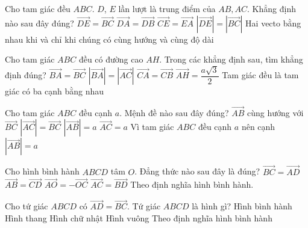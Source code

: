 \begin{ex}%
	Cho tam giác đều $ABC$. $D$, $E$ lần lượt là trung điểm của $AB,AC$. Khẳng định nào sau đây đúng?
	\choice
	{$\overrightarrow{DE}=\overrightarrow{BC}$}
	{$\overrightarrow{DA}=\overrightarrow{DB}$}
	{\True$\overrightarrow{CE}=\overrightarrow{EA}$}
	{ $|\overrightarrow{DE}|=|\overrightarrow{BC}|$}
	\loigiai
	{Hai vecto bằng nhau khi và chỉ khi chúng có cùng hướng và cùng độ dài }
\end{ex}

\begin{ex}%
	Cho tam giác $ABC $ đều có đường cao $AH$. Trong các khẳng định sau, tìm khẳng định đúng?
	\choice
	{$\overrightarrow{BA}=\overrightarrow{BC}$}
	{\True $|\overrightarrow{BA}|=|\overrightarrow{AC}|$}
	{$\overrightarrow{CA}=\overrightarrow{CB}$}
	{$\overrightarrow{AH}=\dfrac{a\sqrt{3}}{2}$}
	\loigiai
	{Tam giác đều là tam giác có ba cạnh bằng nhau}
\end{ex}

\begin{ex}%
	Cho tam giác $ABC$ đều cạnh $a$. Mệnh đề nào sau đây đúng?
	\choice
	{$\overrightarrow{AB}$ cùng hướng với $\overrightarrow{BC}$}
	{$|\overrightarrow{AC}|=\overrightarrow{BC}$}
	{\True $|\overrightarrow{AB}|=a$}
	{$\overrightarrow{AC}=a$}
	\loigiai
	{Vì tam giác $ABC$ đều cạnh $a$ nên cạnh $|\overrightarrow{AB}|=a$ }
\end{ex}


\begin{ex}%
	Cho hình bình hành $ABCD$ tâm $O$. Đẳng thức nào sau đây là đúng?
	\choice
	{\True $\overrightarrow{BC}=\overrightarrow{AD}$}
	{$\overrightarrow{AB}=\overrightarrow{CD}$}
	{$\overrightarrow{AO}=-\overrightarrow{OC}$}
	{$\overrightarrow{AC}=\overrightarrow{BD}$}
	\loigiai
	{Theo định nghĩa hình bình hành.}
\end{ex}

\begin{ex}%
	Cho tứ giác $ABCD$ có $\overrightarrow{AD}=\overrightarrow{BC}$. Tứ giác $ABCD$ là hình gì?
	\choice
	{\True Hình bình hành}
	{Hình thang}
	{Hình chữ nhật}
	{Hình vuông}
	\loigiai
	{Theo định nghĩa hình bình hành}
\end{ex}



